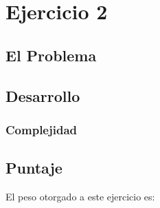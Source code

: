 \section{Ejercicio 2}
\subsection{El Problema}

\subsection{Desarrollo}

\subsubsection{Complejidad}

\subsection{Puntaje}
El peso otorgado a este ejercicio es:
